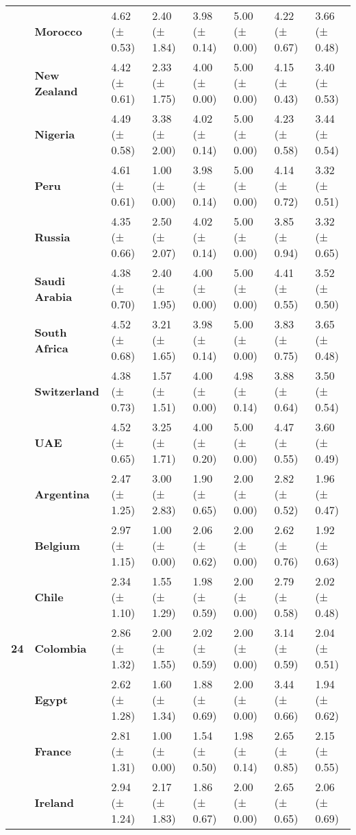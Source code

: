 \begin{longtable}{llllllll}
\textbf{} & \textbf{Morocco} & 4.62 (± 0.53) & 2.40 (± 1.84) & 3.98 (± 0.14) & 5.00 (± 0.00) & 4.22 (± 0.67) & 3.66 (± 0.48) \\
\textbf{} & \textbf{New Zealand} & 4.42 (± 0.61) & 2.33 (± 1.75) & 4.00 (± 0.00) & 5.00 (± 0.00) & 4.15 (± 0.43) & 3.40 (± 0.53) \\
\textbf{} & \textbf{Nigeria} & 4.49 (± 0.58) & 3.38 (± 2.00) & 4.02 (± 0.14) & 5.00 (± 0.00) & 4.23 (± 0.58) & 3.44 (± 0.54) \\
\textbf{} & \textbf{Peru} & 4.61 (± 0.61) & 1.00 (± 0.00) & 3.98 (± 0.14) & 5.00 (± 0.00) & 4.14 (± 0.72) & 3.32 (± 0.51) \\
\textbf{} & \textbf{Russia} & 4.35 (± 0.66) & 2.50 (± 2.07) & 4.02 (± 0.14) & 5.00 (± 0.00) & 3.85 (± 0.94) & 3.32 (± 0.65) \\
\textbf{} & \textbf{Saudi Arabia} & 4.38 (± 0.70) & 2.40 (± 1.95) & 4.00 (± 0.00) & 5.00 (± 0.00) & 4.41 (± 0.55) & 3.52 (± 0.50) \\
\textbf{} & \textbf{South Africa} & 4.52 (± 0.68) & 3.21 (± 1.65) & 3.98 (± 0.14) & 5.00 (± 0.00) & 3.83 (± 0.75) & 3.65 (± 0.48) \\
\textbf{} & \textbf{Switzerland} & 4.38 (± 0.73) & 1.57 (± 1.51) & 4.00 (± 0.00) & 4.98 (± 0.14) & 3.88 (± 0.64) & 3.50 (± 0.54) \\
\textbf{} & \textbf{UAE} & 4.52 (± 0.65) & 3.25 (± 1.71) & 4.00 (± 0.20) & 5.00 (± 0.00) & 4.47 (± 0.55) & 3.60 (± 0.49) \\
\cline{1-8}
\multirow[t]{19}{*}{\textbf{24}} & \textbf{Argentina} & 2.47 (± 1.25) & 3.00 (± 2.83) & 1.90 (± 0.65) & 2.00 (± 0.00) & 2.82 (± 0.52) & 1.96 (± 0.47) \\
\textbf{} & \textbf{Belgium} & 2.97 (± 1.15) & 1.00 (± 0.00) & 2.06 (± 0.62) & 2.00 (± 0.00) & 2.62 (± 0.76) & 1.92 (± 0.63) \\
\textbf{} & \textbf{Chile} & 2.34 (± 1.10) & 1.55 (± 1.29) & 1.98 (± 0.59) & 2.00 (± 0.00) & 2.79 (± 0.58) & 2.02 (± 0.48) \\
\textbf{} & \textbf{Colombia} & 2.86 (± 1.32) & 2.00 (± 1.55) & 2.02 (± 0.59) & 2.00 (± 0.00) & 3.14 (± 0.59) & 2.04 (± 0.51) \\
\textbf{} & \textbf{Egypt} & 2.62 (± 1.28) & 1.60 (± 1.34) & 1.88 (± 0.69) & 2.00 (± 0.00) & 3.44 (± 0.66) & 1.94 (± 0.62) \\
\textbf{} & \textbf{France} & 2.81 (± 1.31) & 1.00 (± 0.00) & 1.54 (± 0.50) & 1.98 (± 0.14) & 2.65 (± 0.85) & 2.15 (± 0.55) \\
\textbf{} & \textbf{Ireland} & 2.94 (± 1.24) & 2.17 (± 1.83) & 1.86 (± 0.67) & 2.00 (± 0.00) & 2.65 (± 0.65) & 2.06 (± 0.69) \\

\end{longtable}
